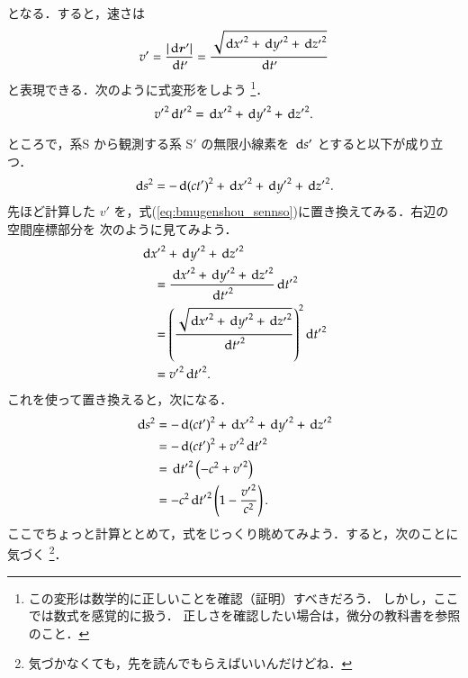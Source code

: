     となる．すると，速さは
        \begin{equation*}
            v' = \frac{\left|\,\mathrm{d} \boldsymbol{r} '\right|}{\,\mathrm{d} t'}
               = \frac{\sqrt{{\,\mathrm{d} x'}^{2} + {\,\mathrm{d} y'}^{2} + {\,\mathrm{d} z'}^{2}}}{\,\mathrm{d} t'}
        \end{equation*}
    と表現できる．次のように式変形をしよう
        \footnote{
        この変形は数学的に正しいことを確認（証明）すべきだろう．
        しかし，ここでは数式を感覚的に扱う．
        正しさを確認したい場合は，微分の教科書を参照のこと．
        }．
        \begin{equation*}
            {v'}^{2} {\,\mathrm{d} t'}^{2}={\,\mathrm{d} x'}^{2} + {\,\mathrm{d} y'}^{2} + {\,\mathrm{d} z'}^{2}.
        \end{equation*}

        ところで，系S から観測する系 S$'$ の無限小線素を $\,\mathrm{d} s'$ とすると以下が成り立つ．
         \begin{align}\label{eq:bmugenshou_sennso}
             \df s^{2} = -{\df (ct')}^{2} + {\df x'}^{2} + {\df y'}^{2} + {\df z'}^{2}.
         \end{align}
    先ほど計算した $v'$ を，式(\ref{eq:bmugenshou_sennso})に置き換えてみる．右辺の空間座標部分を
    次のように見てみよう．
        \begin{align*}
            &{\,\mathrm{d} x'}^{2} + {\,\mathrm{d} y'}^{2} + {\,\mathrm{d} z'}^{2} \\
            &\quad=\frac{{\,\mathrm{d} x'}^{2} + {\,\mathrm{d} y'}^{2} + {\,\mathrm{d} z'}^{2}}{{\,\mathrm{d} t'}^{2}} {\,\mathrm{d} t'}^{2} \\
            &\quad={\left(
                \frac{\sqrt{{\,\mathrm{d} x'}^{2} + {\,\mathrm{d} y'}^{2} + {\,\mathrm{d} z'}^{2}}}{{\,\mathrm{d} t'}^{2}}
                   \right)}^{2} {\,\mathrm{d} t'}^{2}\\
            &\quad={v'}^{2} {\,\mathrm{d} t'}^{2}.
        \end{align*}
    これを使って置き換えると，次になる．
        \begin{align*}
            \,\mathrm{d} s^{2} &= -{\,\mathrm{d} (ct')}^{2} + {\,\mathrm{d} x'}^{2} + {\,\mathrm{d} y'}^{2} + {\,\mathrm{d} z'}^{2} \\
                      &= -{\,\mathrm{d} (ct')}^{2} + {v'}^{2} {\,\mathrm{d} t'}^{2} \\
                      &= {\,\mathrm{d} t'}^{2}\left( -c^{2} + {v'}^{2} \right) \\
                      &= -c^{2}{\,\mathrm{d} t'}^{2}\left( 1 - \frac{{v'}^{2}}{c^{2}} \right).
        \end{align*}
    ここでちょっと計算ととめて，式をじっくり眺めてみよう．すると，次のことに気づく
        \footnote{
            気づかなくても，先を読んでもらえばいいんだけどね．
        }．
